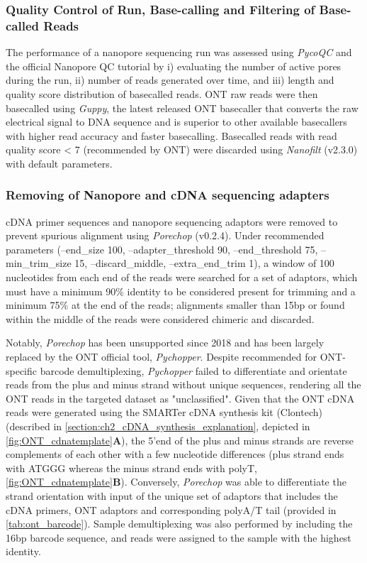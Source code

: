 \clearpage
\subsubsection{Quality Control of Run, Base-calling and Filtering of Base-called Reads}
The performance of a nanopore sequencing run was assessed using \textit{PycoQC}\cite{Leger2019} and the official Nanopore QC tutorial\cite{ONT2019NanoporeQC} by i) evaluating the number of active pores during the run, ii) number of reads generated over time, and iii) length and quality score distribution of basecalled reads. ONT raw reads were then basecalled using \textit{Guppy}, the latest released ONT basecaller that converts the raw electrical signal to DNA sequence and is superior to other available basecallers with higher read accuracy and faster basecalling\cite{Wick2019}. Basecalled reads with read quality score < 7 (recommended by ONT) were discarded using \textit{Nanofilt}\cite{DeCoster2018} (v2.3.0) with default parameters.

\subsubsection{Removing of Nanopore and cDNA sequencing adapters}
cDNA primer sequences and nanopore sequencing adaptors were removed to prevent spurious alignment using \textit{Porechop}\cite{Wick2017} (v0.2.4). Under recommended parameters (--end\_size 100, --adapter\_threshold 90, --end\_threshold 75, --min\_trim\_size 15, --discard\_middle, --extra\_end\_trim 1), a window of 100 nucleotides from each end of the reads were searched for a set of adaptors, which must have a minimum 90\% identity to be considered present for trimming and a minimum 75\% at the end of the reads; alignments smaller than 15bp or found within the middle of the reads were considered chimeric and discarded. 

Notably, \textit{Porechop} has been unsupported since 2018 and has been largely replaced by the ONT official tool, \textit{Pychopper}\cite{OxfordNanoporePychopper}. Despite recommended for ONT-specific barcode demultiplexing, \textit{Pychopper} failed to differentiate and orientate reads from the plus and minus strand without unique sequences, rendering all the ONT reads in the targeted dataset as "unclassified". Given that the ONT cDNA reads were generated using the SMARTer cDNA synthesis kit (Clontech) (described in \cref{section:ch2_cDNA_synthesis_explanation}, depicted in \cref{fig:ONT_cdnatemplate}\textbf{A}), the 5’end of the plus and minus strands are reverse complements of each other with a few nucleotide differences (plus strand ends with ATGGG whereas the minus strand ends with polyT, \cref{fig:ONT_cdnatemplate}\textbf{B}). Conversely, \textit{Porechop} was able to differentiate the strand orientation with input of the unique set of adaptors that includes the cDNA primers, ONT adaptors and corresponding polyA/T tail (provided in \cref{tab:ont_barcode}). Sample demultiplexing was also performed by including the 16bp barcode sequence, and reads were assigned to the sample with the highest identity. 

